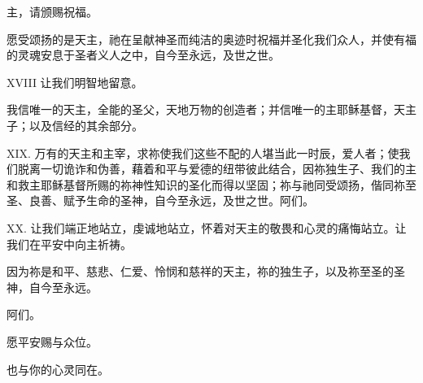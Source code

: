 \par

主，请颁赐祝福。\par

\par

愿受颂扬的是天主，祂在呈献神圣而纯洁的奥迹时祝福并圣化我们众人，并使有福的灵魂安息于圣者义人之中，自今至永远，及世之世。\par

\par

XVIII 让我们明智地留意。\par

\par

我信唯一的天主，全能的圣父，天地万物的创造者；并信唯一的主耶稣基督，天主子；以及信经的其余部分。\par

\par

XIX. 万有的天主和主宰，求祢使我们这些不配的人堪当此一时辰，爱人者；使我们脱离一切诡诈和伪善，藉着和平与爱德的纽带彼此结合，因祢独生子、我们的主和救主耶稣基督所赐的祢神性知识的圣化而得以坚固；祢与祂同受颂扬，偕同祢至圣、良善、赋予生命的圣神，自今至永远，及世之世。阿们。\par

\par

XX. 让我们端正地站立，虔诚地站立，怀着对天主的敬畏和心灵的痛悔站立。让我们在平安中向主祈祷。\par

\par

因为祢是和平、慈悲、仁爱、怜悯和慈祥的天主，祢的独生子，以及祢至圣的圣神，自今至永远。\par

\par

阿们。\par

\par

愿平安赐与众位。\par

\par

也与你的心灵同在。\par

